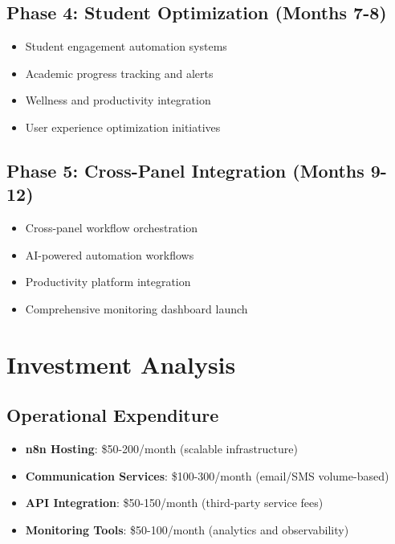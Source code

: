 \subsection{Phase 4: Student Optimization (Months 7-8)}

\begin{itemize}
    \item Student engagement automation systems
    \item Academic progress tracking and alerts
    \item Wellness and productivity integration
    \item User experience optimization initiatives
\end{itemize}

\subsection{Phase 5: Cross-Panel Integration (Months 9-12)}

\begin{itemize}
    \item Cross-panel workflow orchestration
    \item AI-powered automation workflows
    \item Productivity platform integration
    \item Comprehensive monitoring dashboard launch
\end{itemize}

\section{Investment Analysis}

\subsection{Operational Expenditure}

\begin{itemize}
    \item \textbf{n8n Hosting}: \$50-200/month (scalable infrastructure)
    \item \textbf{Communication Services}: \$100-300/month (email/SMS volume-based)
    \item \textbf{API Integration}: \$50-150/month (third-party service fees)
    \item \textbf{Monitoring Tools}: \$50-100/month (analytics and observability)
\end{itemize}

